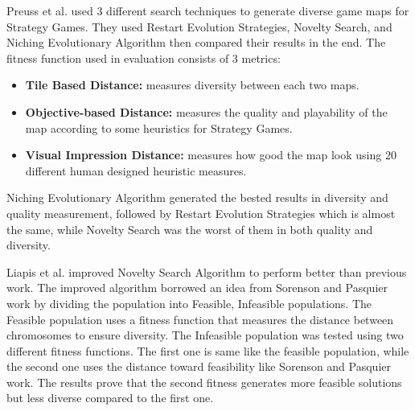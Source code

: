 Preuss et al.\cite{goodDiverseLevels} used 3 different search techniques to generate diverse game maps for Strategy Games. They used Restart Evolution Strategies, Novelty Search, and Niching Evolutionary Algorithm then compared their results in the end. The fitness function used in evaluation consists of 3 metrics:
\begin{itemize} \itemsep0pt \parskip0pt 
	\item \textbf{Tile Based Distance:} measures diversity between each two maps.
	\item \textbf{Objective-based Distance:} measures the quality and playability of the map according to some heuristics for Strategy Games.
	\item \textbf{Visual Impression Distance:} measures how good the map look using 20 different human designed heuristic measures.
\end{itemize}
Niching Evolutionary Algorithm generated the bested results in diversity and quality measurement, followed by Restart Evolution Strategies which is almost the same, while Novelty Search was the worst of them in both quality and diversity.\\\par

Liapis et al.\cite{noveltySearch} improved Novelty Search Algorithm to perform better than previous work\cite{goodDiverseLevels}. The improved algorithm borrowed an idea from Sorenson and Pasquier work\cite{genericLevelFramework} by dividing the population into Feasible, Infeasible populations. The Feasible population uses a fitness function that measures the distance between chromosomes to ensure diversity. The Infeasible population was tested using two different fitness functions. The first one is same like the feasible population, while the second one uses the distance toward feasibility like Sorenson and Pasquier work\cite{genericLevelFramework}. The results prove that the second fitness generates more feasible solutions but less diverse compared to the first one.\\\par

